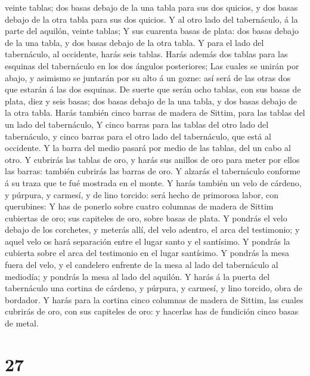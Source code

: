 veinte tablas; dos basas debajo de la una tabla para sus dos quicios, y
dos basas debajo de la otra tabla para sus dos quicios. 
Y al otro lado del tabernáculo, á la parte del aquilón, veinte tablas;
 Y sus cuarenta basas de plata: dos basas debajo de la
una tabla, y dos basas debajo de la otra tabla.  Y para
el lado del tabernáculo, al occidente, harás seis tablas.
 Harás además dos tablas para las esquinas del
tabernáculo en los dos ángulos posteriores;  Las cuales
se unirán por abajo, y asimismo se juntarán por su alto á un gozne: así
será de las otras dos que estarán á las dos esquinas.  De
suerte que serán ocho tablas, con sus basas de plata, diez y seis basas;
dos basas debajo de la una tabla, y dos basas debajo de la otra tabla.
 Harás también cinco barras de madera de Sittim, para las
tablas del un lado del tabernáculo,  Y cinco barras para
las tablas del otro lado del tabernáculo, y cinco barras para el otro
lado del tabernáculo, que está al occidente.  Y la barra
del medio pasará por medio de las tablas, del un cabo al otro.
 Y cubrirás las tablas de oro, y harás sus anillos de oro
para meter por ellos las barras: también cubrirás las barras de oro.
 Y alzarás el tabernáculo conforme á su traza que te fué
mostrada en el monte.  Y harás también un velo de
cárdeno, y púrpura, y carmesí, y de lino torcido: será hecho de
primorosa labor, con querubines:  Y has de ponerlo sobre
cuatro columnas de madera de Sittim cubiertas de oro; sus capiteles de
oro, sobre basas de plata.  Y pondrás el velo debajo de
los corchetes, y meterás allí, del velo adentro, el arca del testimonio;
y aquel velo os hará separación entre el lugar santo y el santísimo.
 Y pondrás la cubierta sobre el arca del testimonio en el
lugar santísimo.  Y pondrás la mesa fuera del velo, y el
candelero enfrente de la mesa al lado del tabernáculo al mediodía; y
pondrás la mesa al lado del aquilón.  Y harás á la puerta
del tabernáculo una cortina de cárdeno, y púrpura, y carmesí, y lino
torcido, obra de bordador.  Y harás para la cortina cinco
columnas de madera de Sittim, las cuales cubrirás de oro, con sus
capiteles de oro: y hacerlas has de fundición cinco basas de metal.

\hypertarget{section-26}{%
\section{27}\label{section-26}}

